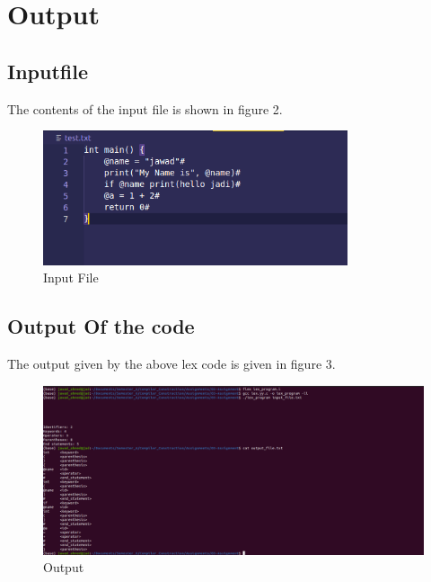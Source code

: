 \documentclass[12pt]{article}
\begin{document}
\section{Output}
\subsection{Inputfile}
The contents of the input file is shown in figure 2.
\begin{figure}[htbp]
  \centering
  \includegraphics[width=0.8\textwidth]{sample_input.png}
  \caption{Input File}
  \label{fig:example}
\end{figure}
\subsection{Output Of the code}
The output given by the above lex code is given in figure 3.
\begin{figure}[htbp]
  \centering
  \includegraphics[width=1\textwidth]{code-output.png}
  \caption{Output}
  \label{fig:example}
\end{figure}
\end{document}
